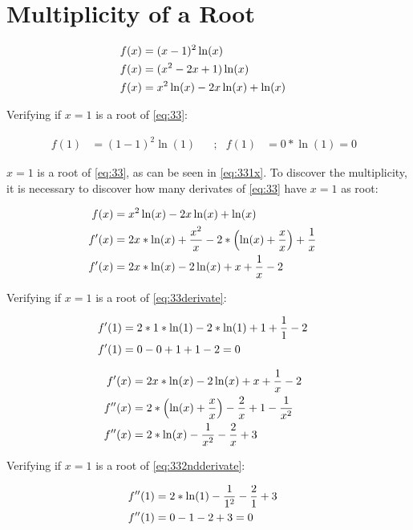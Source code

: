 \section{Multiplicity of a Root}

	\begin{align}
		f(x) &= (x-1)^{2}\ln(x)& \notag \\
		f(x) &= (x^{2} - 2x + 1)\ln(x)& \notag \\
		f(x) &= x^{2}\ln(x) - 2x\ln(x) + \ln(x)&
	\label{eq:33}
	\end{align}

	Verifying if $x=1$ is a root of \cref{eq:33}:

	\begin{align}
		f(1) &= (1-1)^{2}\ln(1)& &;&
		f(1) &= 0*\ln(1) = 0&
	\label{eq:331x}
	\end{align}

	$x=1$ is a root of \cref{eq:33}, as can be seen in \cref{eq:331x}. To discover the multiplicity, it is necessary to discover how many derivates of \cref{eq:33} have $x=1$ as root:

	\begin{align}
		f(x) &= x^{2}\ln(x) - 2x\ln(x) + \ln(x)& \notag \\
		f'(x) &= 2x*\ln(x) + \frac{x^{2}}{x} -2 * \left( \ln(x) + \frac{x}{x} \right) + \frac{1}{x}& \notag \\
		f'(x) &= 2x*\ln(x) - 2\ln(x) + x  + \frac{1}{x} - 2&
	\label{eq:33derivate}
	\end{align}

	Verifying if $x=1$ is a root of \cref{eq:33derivate}:

	\begin{align}
		f'(1) &= 2*1*\ln(1) - 2*\ln(1) + 1 + \frac{1}{1} - 2& \notag \\
		f'(1) &= 0 - 0 + 1 + 1 - 2 = 0&
	\label{eq:33derivate1x}
	\end{align}

	\begin{align}
		f'(x) &= 2x*\ln(x) - 2\ln(x) + x  + \frac{1}{x} - 2& \notag \\
		f''(x) &= 2*\left(\ln(x) + \frac{x}{x}\right) - \frac{2}{x} + 1  - \frac{1}{x^2}& \notag \\
		f''(x) &= 2*\ln(x) - \frac{1}{x^2} - \frac{2}{x} + 3&
	\label{eq:332ndderivate}
	\end{align}

	Verifying if $x=1$ is a root of \cref{eq:332ndderivate}:

	\begin{align}
		f''(1) &= 2*\ln(1) - \frac{1}{1^2} - \frac{2}{1} + 3& \notag \\
		f''(1) &= 0 - 1 - 2 + 3 = 0&
	\label{eq:332ndderivate1x}
	\end{align}

